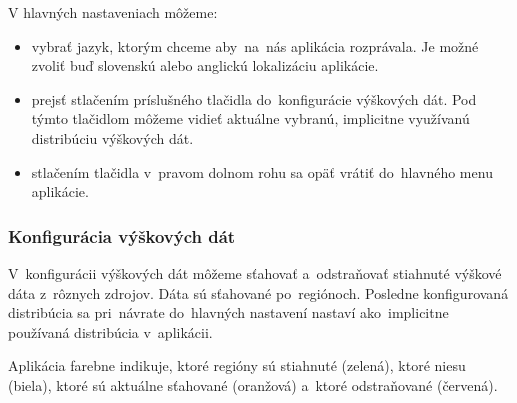 \documentclass[12pt,a4paper]{report}
\begin{document}
V hlavných nastaveniach môžeme:
\begin{itemize}
    \item vybrať jazyk, ktorým chceme aby~na~nás aplikácia rozprávala. Je možné zvoliť buď slovenskú alebo anglickú lokalizáciu aplikácie.
    \item prejsť stlačením príslušného tlačidla do~konfigurácie výškových dát. Pod týmto tlačidlom môžeme vidieť aktuálne vybranú, implicitne využívanú distribúciu výškových dát.
    \item stlačením tlačidla v~pravom dolnom rohu sa opäť vrátiť do~hlavného menu aplikácie.
\end{itemize}

\subsubsection{Konfigurácia výškových dát}

\begin{figure}[h]\centering
{}
\end{figure}

V~konfigurácii výškových dát môžeme sťahovať a~odstraňovať stiahnuté výškové dáta z~rôznych zdrojov. Dáta sú sťahované po~regiónoch. Posledne konfigurovaná distribúcia sa pri~návrate do~hlavných nastavení nastaví ako~implicitne používaná distribúcia v~aplikácii.

Aplikácia farebne indikuje, ktoré regióny sú stiahnuté (zelená), ktoré niesu (biela), ktoré sú aktuálne sťahované (oranžová) a~ktoré odstraňované (červená).
\end{document}
